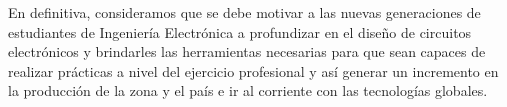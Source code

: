 \documentclass[times, 10pt,twocolumn]{article}
\begin{document}
En definitiva, consideramos que se debe motivar a las nuevas generaciones de estudiantes de Ingeniería Electrónica a profundizar en el diseño de circuitos
electrónicos y brindarles las herramientas necesarias para que sean capaces de realizar prácticas a nivel del ejercicio profesional y así generar un incremento en la producción de la zona y el país e ir al corriente con las tecnologías globales.
%

\end{document}
